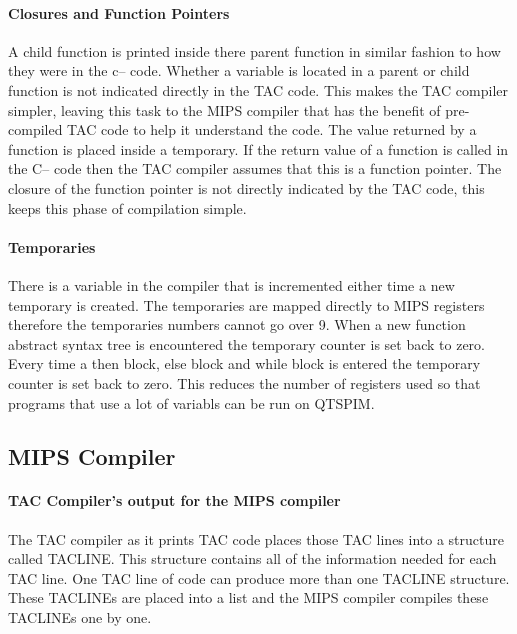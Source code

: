 \documentclass{article}
\begin{document}
	\paragraph{Closures and Function Pointers}
	
	A child function is printed inside there parent function in similar fashion to how they were in the c-- code. Whether a variable is located in a parent or child function is not indicated directly in the TAC code. This makes the TAC compiler simpler, leaving this task to the MIPS compiler that has the benefit of pre-compiled TAC code to help it understand the code. The value returned by a function is placed inside a temporary. If the return value of a function is called in the C-- code then the TAC compiler assumes that this is a function pointer. The closure of the function pointer is not directly indicated by the TAC code, this keeps this phase of compilation simple. 
	
	\paragraph{Temporaries}
	
	There is a variable in the compiler that is incremented either time a new temporary is created. The temporaries are mapped directly to MIPS registers therefore the temporaries numbers cannot go over 9. When a new function abstract syntax tree is encountered the temporary counter is set back to zero. Every time a then block, else block and while block is entered the temporary counter is set back to zero. This reduces the number of registers used so that programs that use a lot of variabls can be run on QTSPIM. 
	
	\subsection{MIPS Compiler}
	
	\paragraph{TAC Compiler's output for the MIPS compiler} 
	
	The TAC compiler as it prints TAC code places those TAC lines into a structure called TACLINE. This structure contains all of the information needed for each TAC line. One TAC line of code can produce more than one TACLINE structure. These TACLINEs are placed into a list and the MIPS compiler compiles these TACLINEs one by one. 
	
\end{document}
